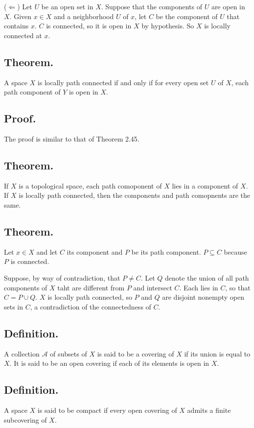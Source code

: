\documentclass[titlepage]{article}
\begin{document}
($\Leftarrow$) Let $U$ be an open set in $X$. Suppose that the components of $U$ are open in $X$. Given $x \in X$ and a neighborhood $U$ of $x$, let $C$ be the component of $U$ that contains $x$. $C$ is connected, so it is open in $X$ by hypothesis. So $X$ is locally connected at $x$.

\subsection{Theorem.} A space $X$ is locally path connected if and only if for every open set $U$ of $X$, each path component of $Y$ is open in $X$.

\subsection{Proof.} The proof is similar to that of Theorem 2.45.

\subsection{Theorem.} If $X$ is a topological space, each path comoponent of $X$ lies in a component of $X$. If $X$ is locally path connected, then the components and path comopnents are the same.

\subsection{Theorem.} Let $x \in X$ and let $C$ its component and $P$ be its path component. $P \subseteq C$ because $P$ is connected.

Suppose, by way of contradiction, that $P \neq C$. Let $Q$ denote the union of all path components of $X$ taht are different from $P$ and intersect $C$. Each lies in $C$, so that $C = P \cup Q$. $X$ is locally path connected, so $P$ and $Q$ are disjoint nonempty open sets in $C$, a contradiction of the connectedness of $C$.

\subsection{Definition.} A collection $\mathcal{A}$ of subsets of $X$ is said to be a covering of $X$ if its union is equal to $X$. It is said to be an open covering if each of its elements is open in $X$.

\subsection{Definition.} A space $X$ is said to be compact if every open covering of $X$ admits a finite subcovering of $X$.
\end{document}
